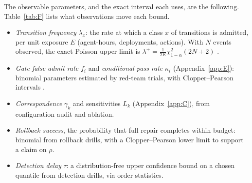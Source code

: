 \documentclass[11pt]{article}
\theoremstyle{definition}
\begin{document}
The observable parameters, and the exact interval each uses, are the following. Table~\ref{tab:F} lists what observations move each bound.

\begin{itemize}[leftmargin=1.6em,itemsep=0.1em]
\item \emph{Transition frequency} $\lambda_x$: the rate at which a class $x$ of transitions is admitted, per unit exposure $E$ (agent-hours, deployments, actions). With $N$ events observed, the exact Poisson upper limit is $\lambda^+=\tfrac{1}{2E}\chi^2_{1-\alpha}(2N+2)$ \cite{garwood1936}.
\item \emph{Gate false-admit rate} $f_i$ and \emph{conditional pass rate} $\kappa_i$ (Appendix~\ref{app:E}): binomial parameters estimated by red-team trials, with Clopper--Pearson intervals \cite{clopper1934}.
\item \emph{Correspondence} $\gamma_k$ and sensitivities $L_k$ (Appendix~\ref{app:C}), from configuration audit and ablation.
\item \emph{Rollback success}, the probability that full repair completes within budget: binomial from rollback drills, with a Clopper--Pearson lower limit to support a claim on $\rho$.
\item \emph{Detection delay} $\tau$: a distribution-free upper confidence bound on a chosen quantile from detection drills, via order statistics.
\end{itemize}
\end{document}
